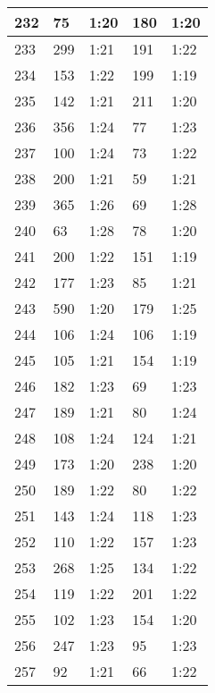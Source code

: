 \begin{center}
\begin{longtable}{|p{2cm}|l|l|l|l|}
232	&   75            &  1:20  &		180     	& 1:20 \\ \hline
233	&   299           &  1:21  &		191     	& 1:22 \\ \hline
234	&   153           &  1:22  &		199     	& 1:19 \\ \hline
235	&   142           &  1:21  &		211     	& 1:20 \\ \hline
236	&   356           &  1:24  &		77      	& 1:23 \\ \hline
237	&   100           &  1:24  &		73      	& 1:22 \\ \hline
238	&   200           &  1:21  &		59      	& 1:21 \\ \hline
239	&   365           &  1:26  &		69      	& 1:28 \\ \hline
240	&   63            &  1:28  &		78          & 1:20 \\ \hline
241	&   200           &  1:22  &		151     	& 1:19 \\ \hline
242	&   177           &  1:23  &		85      	& 1:21 \\ \hline
243	&   590           &  1:20  &		179     	& 1:25 \\ \hline
244	&   106           &  1:24  &		106     	& 1:19 \\ \hline
245	&   105           &  1:21  &		154     	& 1:19 \\ \hline
246	&   182           &  1:23  &		69      	& 1:23 \\ \hline
247	&   189           &  1:21  &		80      	& 1:24 \\ \hline
248	&   108           &  1:24  &		124     	& 1:21 \\ \hline
249	&   173           &  1:20  &		238     	& 1:20 \\ \hline
250	&   189           &  1:22  &		80      	& 1:22 \\ \hline
251	&   143           &  1:24  &		118     	& 1:23 \\ \hline
252	&   110           &  1:22  &		157     	& 1:23 \\ \hline
253	&   268           &  1:25  &		134     	& 1:22 \\ \hline
254	&   119           &  1:22  &		201     	& 1:22 \\ \hline
255	&   102           &  1:23  &		154     	& 1:20 \\ \hline
256	&   247           &  1:23  &		95      	& 1:23 \\ \hline
257	&   92            &  1:21  &		66      	& 1:22 \\ \hline

\end{longtable}
\end{center}
